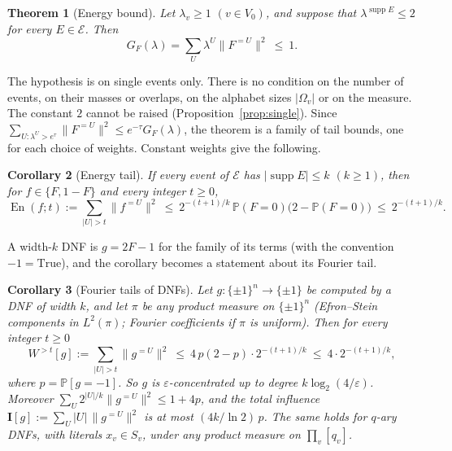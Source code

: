 \documentclass[11pt,reqno]{amsart}
\newtheorem{theorem}{Theorem}[section]
\newtheorem{corollary}[theorem]{Corollary}
\theoremstyle{definition}
\newcommand{\PP}{\mathbb P}
\newcommand{\supp}{\operatorname{supp}}
\newcommand{\energy}{\operatorname{En}}
\newcommand{\cE}{\mathcal E}
\begin{document}
\begin{theorem}[Energy bound]\label{thm:main}
Let $\lambda_v\ge1$ $(v\in V_0)$, and suppose that $\lambda^{\supp E}\le2$ for every
$E\in\cE$.  Then
\[
 G_F(\lambda)=\sum_U\lambda^U\|F^{=U}\|^2\ \le\ 1 .
\]
\end{theorem}

The hypothesis is on single events only.  There is no condition on the
number of events, on their masses or overlaps, on the alphabet sizes
$|\Omega_v|$ or on the measure.  The constant $2$ cannot be raised
(Proposition~\ref{prop:single}).  Since
$\sum_{U:\lambda^U>e^\tau}\|F^{=U}\|^2\le e^{-\tau}G_F(\lambda)$, the theorem is a family of
tail bounds, one for each choice of weights.  Constant weights give the
following.

\begin{corollary}[Energy tail]\label{cor:tail}
If every event of $\cE$ has $|\supp E|\le k$ $(k\ge1)$, then for
$f\in\{F,1-F\}$ and every integer $t\ge0$,
\[
 \energy(f;t):=\sum_{|U|>t}\|f^{=U}\|^2\ \le\ 2^{-(t+1)/k}\,\PP(F=0)\big(2-\PP(F=0)\big)\ \le\ 2^{-(t+1)/k}.
\]
\end{corollary}

A width-$k$ DNF is $g=2F-1$ for the family of its terms (with the convention
$-1=\mathrm{True}$), and the corollary becomes a statement about its Fourier
tail.

\begin{corollary}[Fourier tails of DNFs]\label{cor:dnf}
Let $g:\{\pm1\}^n\to\{\pm1\}$ be computed by a DNF of width $k$, and let $\pi$ be
any product measure on $\{\pm1\}^n$ (Efron--Stein components in $L^2(\pi)$;
Fourier coefficients if $\pi$ is uniform).  Then for every integer $t\ge0$
\[
 W^{>t}[g]:=\sum_{|U|>t}\|g^{=U}\|^2\ \le\ 4\,p(2-p)\cdot2^{-(t+1)/k}\ \le\ 4\cdot2^{-(t+1)/k},
\]
where $p=\PP[g=-1]$.
So $g$ is $\varepsilon$-concentrated up to degree $k\log_2(4/\varepsilon)$.  Moreover
$\sum_U2^{|U|/k}\|g^{=U}\|^2\le1+4p$, and the total influence
$\mathbf I[g]:=\sum_U|U|\,\|g^{=U}\|^2$ is at most $(4k/\ln2)\,p$.  The same holds for $q$-ary DNFs, with literals $x_v\in S_v$,
under any product measure on $\prod_v[q_v]$.
\end{corollary}
\end{document}
